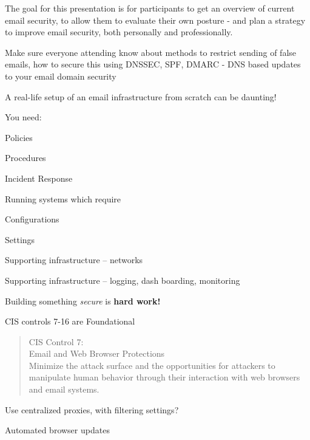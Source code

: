 \documentclass[Screen16to9,17pt]{foils}
\begin{document}

The goal for this presentation is for participants to get an overview of current email security, to allow them to evaluate their own posture - and plan a strategy to improve email security, both personally and professionally.

Make sure everyone attending know about methods to restrict sending of false
emails, how to secure this using DNSSEC, SPF, DMARC - DNS based updates to your
email domain security


\begin{list1}
\item A real-life setup of an email infrastructure from scratch can be daunting!
\item You need:
\begin{list2}
\item Policies
\item Procedures
\item Incident Response
\end{list2}
\item Running systems which require
\begin{list2}
\item Configurations
\item Settings
\item Supporting infrastructure -- networks
\item Supporting infrastructure -- logging, dash boarding, monitoring
\end{list2}
\item Building something \emph{secure} is {\bf hard work!}
\end{list1}



CIS controls 7-16 are Foundational

\begin{quote}
CIS Control 7:\\
Email and Web Browser Protections\\
Minimize the attack surface and the opportunities for attackers to manipulate human behavior through their interaction with web browsers and email systems.
\end{quote}

\begin{list1}
\item Use centralized proxies, with filtering settings?
\item Automated browser updates
\item
\item
\end{list1}
\end{document}
